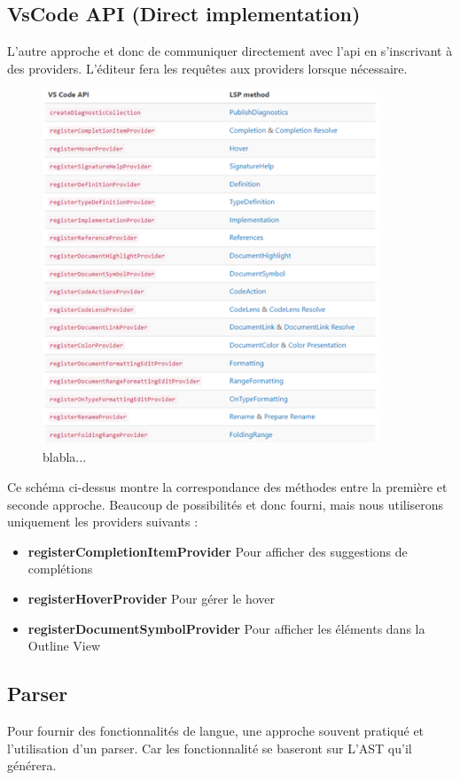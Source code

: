 \documentclass[
    iict, %
    il, %
]{heig-tb}
\begin{document}
\subsection{VsCode API (Direct implementation)}
L'autre approche et donc de communiquer directement avec l'api en s'inscrivant à des providers.
L'éditeur fera les requêtes aux providers lorsque nécessaire.

\begin{figure}[!ht]
    \begin{center}
        \includegraphics[width=10cm]{assets/figures/api-vscode.png}
    \end{center}
    \caption[API]{\label{test} blabla...}
\end{figure}

Ce schéma ci-dessus montre la correspondance des méthodes entre la première et seconde approche.
Beaucoup de possibilités et donc fourni, mais nous utiliserons uniquement les providers suivants :

\begin{itemize}
    \item \textbf{registerCompletionItemProvider}
          \subitem Pour afficher des suggestions de complétions
    \item \textbf{registerHoverProvider}
          \subitem Pour gérer le hover
    \item \textbf{registerDocumentSymbolProvider}
          \subitem Pour afficher les éléments dans la Outline View
\end{itemize}

\subsection{Parser}
Pour fournir des fonctionnalités de langue, une approche souvent pratiqué et l'utilisation d'un parser.
Car les fonctionnalité se baseront sur L'AST qu'il générera.
\end{document}
